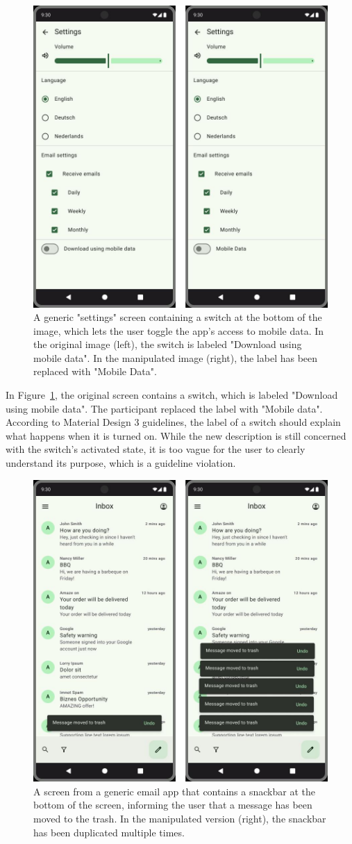 \documentclass[11pt,titlepage,oneside,openany]{book}
\begin{document}
\begin{figure}[t]
	\centering
	\includegraphics[width=.6\textwidth]{figures/us_ex_1.jpg}
	\caption{A generic "settings" screen containing a switch at the bottom of the image, which lets the user toggle the app's access to mobile data. In the original image (left), the switch is labeled "Download using mobile data". In the manipulated image (right), the label has been replaced with "Mobile Data".}
	\label{fig:us_ex_1}
\end{figure}

In Figure~\ref{fig:us_ex_1}, the original screen contains a switch, which is labeled "Download using mobile data". The participant replaced the label with "Mobile data". According to Material Design 3 guidelines, the label of a switch should explain what happens when it is turned on. While the new description is still concerned with the switch's activated state, it is too vague for the user to clearly understand its purpose, which is a guideline violation.

\begin{figure}[t]
	\centering
	\includegraphics[width=.6\textwidth]{figures/us_ex_2.jpg}
	\caption{A screen from a generic email app that contains a snackbar at the bottom of the screen, informing the user that a message has been moved to the trash. In the manipulated version (right), the snackbar has been duplicated multiple times.}
	\label{fig:us_ex_2}
\end{figure}
\end{document}
